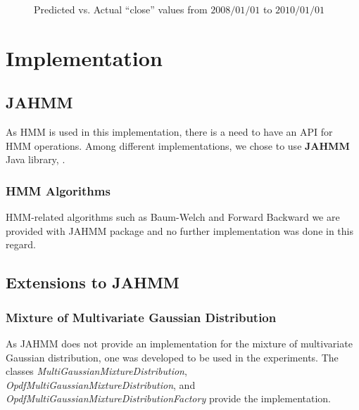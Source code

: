\documentclass{acm_proc_article-sp}
\begin{document}
\begin{figure}[t] 
\centering
\setlength\fboxsep{0.1pt}
\setlength\fboxrule{0.7pt}
\caption{Predicted vs. Actual ``close'' values from $2008/01/01$ to $2010/01/01$} \label{fig:res1}
\end{figure}

\section{Implementation} \label{sec:impl}

\subsection{JAHMM}
As HMM is used in this implementation, there is a need to have an API for HMM operations. Among different
implementations, we chose to use \textbf{JAHMM} Java library, \cite{jahmm}.

\subsubsection{HMM Algorithms}
HMM-related algorithms such as Baum-Welch and Forward Backward we are provided with JAHMM package and no further
implementation was done in this regard.

\subsection{Extensions to JAHMM}

\subsubsection{Mixture of Multivariate Gaussian Distribution}
As JAHMM does not provide an implementation for the mixture of multivariate Gaussian distribution, one was developed to
be used in the experiments. The classes \textit{MultiGaussianMixtureDistribution},
\textit{OpdfMultiGaussianMixtureDistribution}, and \textit{OpdfMultiGaussianMixtureDistributionFactory} provide the
implementation.
\end{document}
